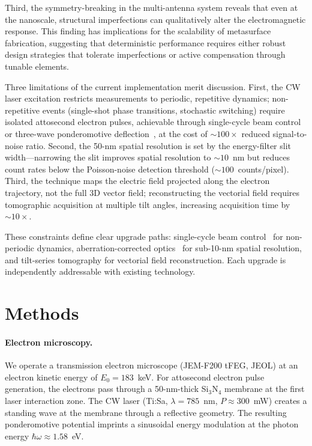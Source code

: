 \documentclass[12pt]{article}
\begin{document}
Third, the symmetry-breaking in the multi-antenna system reveals that even at the nanoscale, structural imperfections can qualitatively alter the electromagnetic response. This finding has implications for the scalability of metasurface fabrication, suggesting that deterministic performance requires either robust design strategies that tolerate imperfections or active compensation through tunable elements.

Three limitations of the current implementation merit discussion. First, the CW laser excitation restricts measurements to periodic, repetitive dynamics; non-repetitive events (single-shot phase transitions, stochastic switching) require isolated attosecond electron pulses, achievable through single-cycle beam control~\cite{Baum2007} or three-wave ponderomotive deflection~\cite{Morimoto2020}, at the cost of ${\sim}100\times$ reduced signal-to-noise ratio. Second, the 50-nm spatial resolution is set by the energy-filter slit width---narrowing the slit improves spatial resolution to ${\sim}10$~nm but reduces count rates below the Poisson-noise detection threshold (${\sim}100$~counts/pixel). Third, the technique maps the electric field projected along the electron trajectory, not the full 3D vector field; reconstructing the vectorial field requires tomographic acquisition at multiple tilt angles, increasing acquisition time by ${\sim}10\times$.

These constraints define clear upgrade paths: single-cycle beam control~\cite{Baum2007} for non-periodic dynamics, aberration-corrected optics~\cite{Morimoto2018} for sub-10-nm spatial resolution, and tilt-series tomography for vectorial field reconstruction. Each upgrade is independently addressable with existing technology.

\section{Methods}
\label{sec:methods}

\paragraph{Electron microscopy.} We operate a transmission electron microscope (JEM-F200 tFEG, JEOL) at an electron kinetic energy of $E_0 = 183$~keV. For attosecond electron pulse generation, the electrons pass through a 50-nm-thick Si$_3$N$_4$ membrane at the first laser interaction zone. The CW laser (Ti:Sa, $\lambda = 785$~nm, $P \approx 300$~mW) creates a standing wave at the membrane through a reflective geometry. The resulting ponderomotive potential imprints a sinusoidal energy modulation at the photon energy $\hbar\omega \approx 1.58$~eV.
\end{document}
